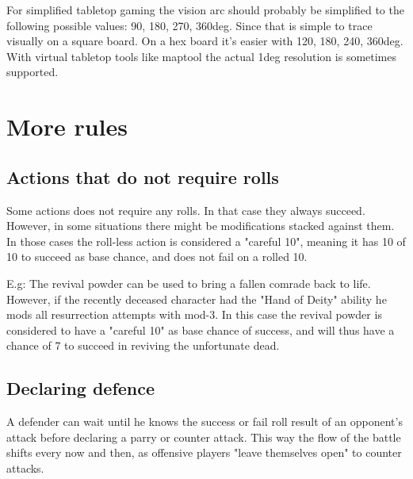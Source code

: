 For simplified tabletop gaming the vision arc should probably be simplified to the following possible values: 90, 180, 270, 360deg. Since that is simple to trace visually on a square board. On a hex board it's easier with 120, 180, 240, 360deg. With virtual tabletop tools like maptool the actual 1deg resolution is sometimes supported.









\section*{More rules}


\subsection*{Actions that do not require rolls}
Some actions does not require any rolls. In that case they always succeed. However, in some situations there might be modifications stacked against them. In those cases the roll-less action is considered a "careful 10", meaning it has 10 of 10 to succeed as base chance, and does not fail on a rolled 10.

E.g: The revival powder can be used to bring a fallen comrade back to life. However, if the recently deceased character had the "Hand of Deity" ability he mods all resurrection attempts with mod-3. In this case the revival powder is considered to have a "careful 10" as base chance of success, and will thus have a chance of 7 to succeed in reviving the unfortunate dead.


\subsection*{Declaring defence}
A defender can wait until he knows the success or fail roll result of an opponent's attack before declaring a parry or counter attack. This way the flow of the battle shifts every now and then, as offensive players "leave themselves open" to counter attacks.

